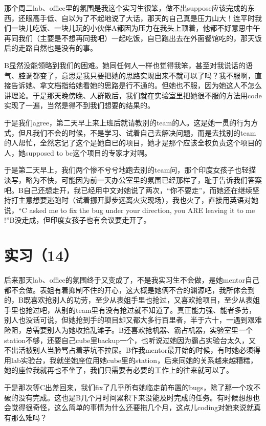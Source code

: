 \documentclass[12pt]{book}
\begin{document}
那个周二lab、office里的氛围是我这个实习生很笨，做不出suppose应该完成的东西，还眼高手低、自以为了不起地说了大话，那天的自己真是压力山大！连平时我们一块儿吃饭、一块儿玩的小伙伴A都因为压力在我头上顶着，他都不好意思中午再同我们（主要是不想再同我吧）一起吃饭，自已跑出去在外面餐馆吃的，那天饭后的走路自然也是没有的事。

B显然没能领略到我们的困难。她同任何人一样也觉得我笨，甚至对我说话的语气、腔调都变了，意思是我只要把她的思路实现出来不就可以了吗？我不服啊，直接告诉她、拿文档指给她看她的思路是行不通的。但她也不服，因为她这人不怎么讲理论。于是那天晚傍晚、人群散后，我们就在实验室里把她很不服的方法用code实现了一遍，当然是得不到我们想要的结果的。

于是我们agree，第二天早上来上班后就请教别的team的人。这是她一贯的行为方式，但凡我们不会的时候，不是学习、试着自己去解决问题，而是去找别的team的人帮忙，全然忘记了这个是她自已的项目，她才是那个应该全权负责这个项目的人，她supposed to be这个项目的专家才对啊。

于是第二天早上，我们两个惨不兮兮地跑去别的team问，那个印度女孩子也轻描淡写，略为不快，可能因为前一天办公室里的氛围已经那样了，耻于告诉我们答案吧。B自己还想走开，我已经用中文对她说了两次，“你不要走”，而她还在继续坚持打主意想要逃跑时（试着挪开脚步远离火灾现场），我也火了，直接用英语对她说，“C asked me to fix the bug under your direction, you ARE leaving it to me !”B没走成，但印度女孩子也有会议要走开了。


\section{实习（14）}
\label{sec-5-17}

后来那天lab、office的氛围终于又变成了，不是我实习生不会做，是她mentor自己都不会做。表姐有着抑制不住的开心，这大概是她俩不合的渊源吧，我所体会到的，B既喜欢抢别人的功劳，至少从表姐手里也抢过，又喜欢抢项目，至少从表姐手里也抢过吧，从别的team里有没有抢过就不知道了。真正能力强、能者多劳，别人也没话可说，但她抢到手的项目却又都大多行百里者，半于六十，一遇到艰难险阻，总需要别人为她收拾乱滩子。B还喜欢抢机器、霸占机器，实验室里一个station不够，还要自己cube里backup一个，也听说过她因为霸占实验台太久，又不出活被别人当脸骂占着茅坑不拉屎。B作我mentor最开始的时候，有时她必须得用lab实验台，我就坐她座位用她cube里的station，后来同她的关系越来越糟糕，她的座位我就再也不坐了，我们只需要有必要的工作上的往来就可以了。

于是那次等C出差回来，我们fix了几乎所有她临走前布置的bugs，除了那一个攻不破的没有完成。这也是B几个月时间累积下来没能及时完成的任务。有时候想想也会觉得很奇怪，这么简单的事情为什么还要拖几个月，这点儿coding对她来说就真有那么难吗？
\end{document}
